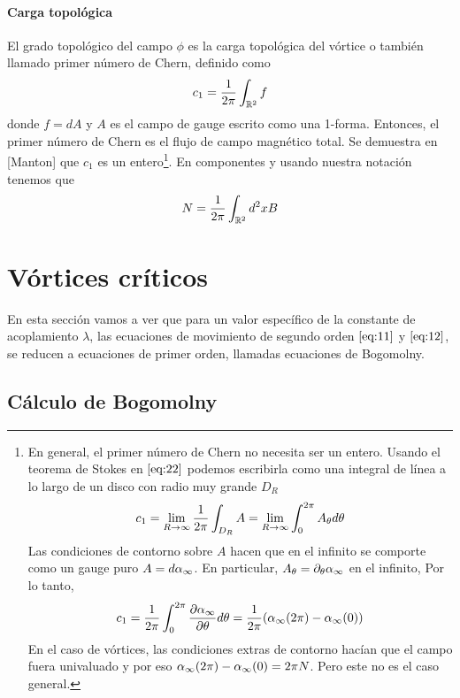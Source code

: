 \paragraph{Carga topológica} El grado topológico del campo $\phi$ es la carga topológica del vórtice o también llamado primer número de Chern, definido como
\begin{align}
    c_1 = \frac{1}{2\pi}\int_{\mathbb{R}^2} f \label{eq:22}
\end{align}
donde $f=dA$ y $A$ es el campo de gauge escrito como una 1-forma. Entonces, el primer número de Chern es el flujo de campo magnético total. Se demuestra en [Manton] que $c_1$ es un entero\footnote{En general, el primer número de Chern no necesita ser un entero. Usando el teorema de Stokes en $\eqref{eq:22}$ podemos escribirla como una integral de línea a lo largo de un disco con radio muy grande $D_R$
\begin{align}
    c_1 = \lim_{R\rightarrow\infty} \frac{1}{2\pi}\int_{D_R} A = \lim_{R\rightarrow\infty}\int_0^{2\pi} A_\theta d\theta
\end{align}
Las condiciones de contorno sobre $A$ hacen que en el infinito se comporte como un gauge puro $A=d\alpha_\infty$. En particular, $A_\theta=\partial_\theta\alpha_\infty$ en el infinito, Por lo tanto,
\begin{align}
    c_1 = \frac{1}{2\pi}\int_0^{2\pi}\frac{\partial\alpha_\infty}{\partial\theta}d\theta = \frac{1}{2\pi}(\alpha_\infty(2\pi)-\alpha_\infty(0))
\end{align}
En el caso de vórtices, las condiciones extras de contorno hacían que el campo fuera univaluado y por eso $\alpha_\infty(2\pi)-\alpha_\infty(0)=2\pi N$. Pero este no es el caso  general.}. En componentes y usando nuestra notación tenemos que
\begin{align}
    N = \frac{1}{2\pi}\int_{\mathbb{R}^2}d^2x B
\end{align}

\section{Vórtices críticos}

En esta sección vamos a ver que para un valor específico de la constante de acoplamiento $\lambda$, las ecuaciones de movimiento de segundo orden $\eqref{eq:11}$ y $\eqref{eq:12}$, se reducen a ecuaciones de primer orden, llamadas ecuaciones de Bogomolny.

\subsection{Cálculo de Bogomolny}

